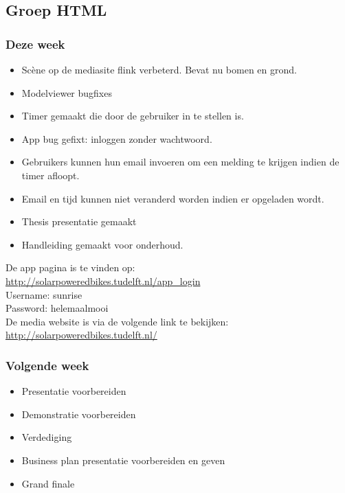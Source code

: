 \subsection*{Groep HTML}
\subsubsection*{Deze week}
\begin{itemize}
\item Sc\`ene op de mediasite flink verbeterd. Bevat nu bomen en grond.
\item Modelviewer bugfixes
\item Timer gemaakt die door de gebruiker in te stellen is.
\item App bug gefixt: inloggen zonder wachtwoord.
\item Gebruikers kunnen hun email invoeren om een melding te krijgen indien de timer afloopt.
\item Email en tijd kunnen niet veranderd worden indien er opgeladen wordt.
\item Thesis presentatie gemaakt
\item Handleiding gemaakt voor onderhoud.

\end{itemize}

\noindent De app pagina is te vinden op:\\ \url{http://solarpoweredbikes.tudelft.nl/app_login}\\

\noindent Username: sunrise\\
\noindent Password: helemaalmooi\\

\noindent De media website is via de volgende link te bekijken:\\
\url{http://solarpoweredbikes.tudelft.nl/}\\


\subsubsection*{Volgende week}
\begin{itemize}

\item Presentatie voorbereiden
\item Demonstratie voorbereiden
\item Verdediging
\item Business plan presentatie voorbereiden en geven
\item Grand finale

\end{itemize}

